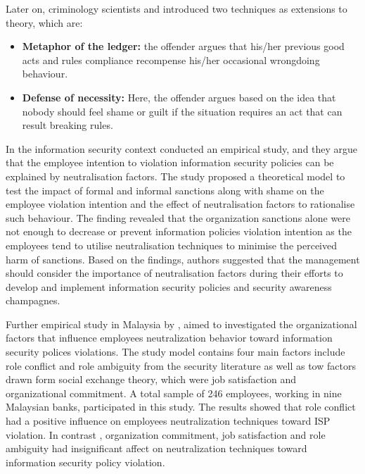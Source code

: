 Later on, criminology scientists \citet{Rogers1974} and \citet{Minor1981} introduced two techniques as extensions to \citet{Sykes1957} theory, which are:
\begin{itemize}
\item \textbf{Metaphor of the ledger:} the offender argues that his/her previous good acts and rules compliance recompense his/her occasional wrongdoing behaviour\citet{Rogers1974}.
\item \textbf{Defense of necessity:} Here, the offender argues based on the idea that nobody should feel shame or guilt if the situation requires an act that can result breaking rules\cite{Minor1981}.
\end{itemize}

In the information security context \citet{Siponen2010}conducted an empirical study, and they argue that the employee intention to violation information security policies can be explained by neutralisation factors. The study proposed a theoretical model to test the impact of formal and informal sanctions along with shame on the employee violation intention and the effect of neutralisation factors to rationalise such behaviour. The finding revealed that the organization sanctions alone were not enough to decrease or prevent information policies violation intention as the employees tend to utilise neutralisation techniques to minimise the perceived harm of sanctions. Based on the findings,  authors suggested that the management should consider the importance of neutralisation factors during their efforts to develop and implement information security policies and security awareness champagnes.      

Further empirical study in Malaysia by \citet{Teh2015}, aimed to investigated the organizational factors that influence employees neutralization behavior toward information security polices violations. The study model contains four main  factors include role conflict and role ambiguity from the security literature as well as tow factors drawn form social exchange theory, which were job satisfaction and organizational commitment. A total sample of 246 employees, working in nine Malaysian banks, participated in this study. The results showed that role conflict had a positive influence on employees neutralization techniques toward ISP violation. In contrast , organization commitment, job satisfaction and role ambiguity had insignificant affect on neutralization techniques toward information security policy violation. 

